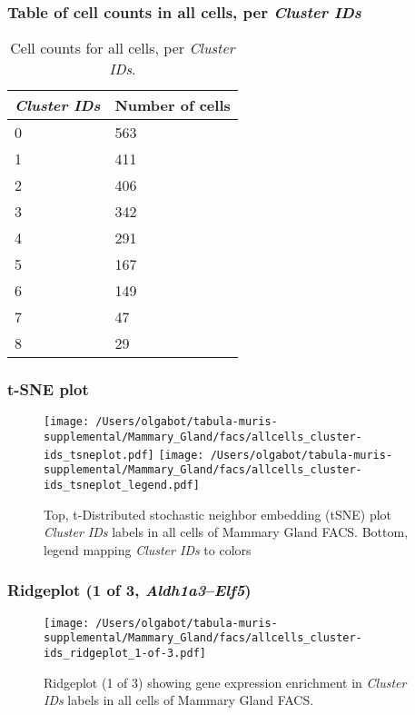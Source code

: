 \subsubsection{Table of cell counts in all cells, per \emph{Cluster IDs}}\begin{table}[h]
\centering
\label{my-label}
\begin{tabular}{@{}ll@{}}
\toprule

\emph{Cluster IDs}& Number of cells \\ \midrule
0 & 563 \\

1 & 411 \\

2 & 406 \\

3 & 342 \\

4 & 291 \\

5 & 167 \\

6 & 149 \\

7 & 47 \\

8 & 29 \\
\bottomrule
\end{tabular}
\caption{Cell counts for all cells, per \emph{Cluster IDs}.}
\end{table}

\clearpage
\subsubsection{t-SNE plot}
\begin{figure}[h]
\centering
\texttt{[image: /Users/olgabot/tabula-muris-supplemental/Mammary\_Gland/facs/allcells\_cluster-ids\_tsneplot.pdf]}
\texttt{[image: /Users/olgabot/tabula-muris-supplemental/Mammary\_Gland/facs/allcells\_cluster-ids\_tsneplot\_legend.pdf]}
\caption{Top, t-Distributed stochastic neighbor embedding (tSNE) plot  \emph{Cluster IDs} labels in all cells of Mammary Gland FACS. Bottom, legend mapping \emph{Cluster IDs} to colors}
\end{figure}


\clearpage

\subsubsection{Ridgeplot (1 of 3, \emph{Aldh1a3}--\emph{Elf5})}
\begin{figure}[h]
\centering
\texttt{[image: /Users/olgabot/tabula-muris-supplemental/Mammary\_Gland/facs/allcells\_cluster-ids\_ridgeplot\_1-of-3.pdf]}

\caption{ Ridgeplot (1 of 3)  showing gene expression enrichment in \emph{Cluster IDs} labels in all cells of Mammary Gland FACS. }
\end{figure}


